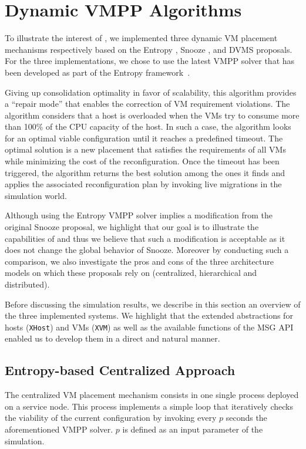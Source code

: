 \section{Dynamic VMPP Algorithms}
\label{sec:vm-schedulers}
To illustrate the interest of \vmps, we implemented three dynamic VM
placement mechanisms respectively based on the Entropy
\cite{Hermenier:2009:ECM:1508293.1508300}, Snooze
\cite{feller:ccgrid12}, and DVMS \cite{quesnel:cpe2012} proposals. For the three
implementations, we chose to use the latest VMPP solver that has been
developed as part of the Entropy
framework~\cite{hermenier:cp11}.

%
Giving up consolidation
optimality in favor of scalability, this algorithm provides a ``repair
mode'' that enables the correction of VM requirement violations. The algorithm considers that a host is
overloaded when the VMs try to consume more than 100\% of the CPU
capacity of the host. In such a case, the algorithm looks for
an optimal viable configuration until it reaches a predefined timeout.
The optimal solution is a new placement that satisfies
the requirements of all VMs while minimizing the cost of the
reconfiguration.
Once the timeout has been triggered, the algorithm returns
the best solution among the ones it finds and applies the associated
reconfiguration plan by invoking live migrations in the simulation
world.

%
Although using the Entropy VMPP solver
implies a modification from the original Snooze proposal,  we
highlight that our goal is to illustrate the capabilities of \vmps and
thus we believe that such a modification is acceptable as it does not
change the global behavior of Snooze. Moreover by
conducting such a comparison, we also investigate the pros and cons of
the three  architecture models on which these proposals rely on (\ie centralized, hierarchical and
distributed).

%
Before discussing the simulation results, we
describe in this section an overview of the three implemented systems.
We highlight that the extended abstractions for hosts (\texttt{XHost})
and VMs (\texttt{XVM}) as well as the available functions of the \sg
MSG API enabled us to develop them in a direct and natural manner.


\subsection{Entropy-based Centralized Approach}
\label{subsec:entropy}
The centralized VM placement mechanism consists in one single \sg
process deployed on a service node. This process implements a simple loop that
iteratively checks the viability of the current configuration by
invoking every $p$ seconds the aforementioned VMPP solver. $p$ is
defined as an input parameter of the simulation.

